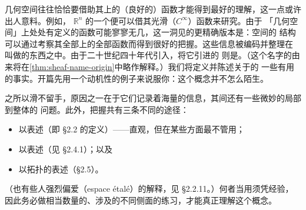 
几何空间往往恰恰要借助其上的（良好的）函数才能得到最好的理解，这一点或许出人意料。例如，
$\mathbb{R}^n$ 的一个\trDifferentiable{}\trManifold{}便可以借其光滑（$C^\infty$）函数来研究。由于%
「几何空间」上处处有定义的函数可能寥寥无几，这一洞见的更精确版本是：空间的%
结构可以通过考察其全部\trOpenSubset{}上的全部函数而得到很好的把握。这些信息被编码并整理在
叫做\emph{\trSheaf}的东西之中。\trSheaf{}由\trLeray{}于二十世纪四十年代引入，将它引进\trAlgebraicGeometry{}的
则是\trSerre。（这个名字的由来将在\cref{thm:sheaf-name-origin}中略作解释。）我们将定义\trSheaf{}并陈述关于\trSheaf{}的
一些有用的事实。开篇先用一个动机性的例子来说服你：这个概念并不怎么陌生。

\trSheaf{}之所以滑不留手，原因之一在于它们记录着海量的信息，其间还有一些微妙的局部到整体的
问题。此外，把握\trSheaf{}共有三条不同的途径：
\begin{itemize}
\item 以\trOpenSet{}表述（即 \S2.2 的定义）——直观，但在某些方面最不管用；
\item 以\trStalk{}表述（见 \S2.4.1）；以及
\item 以拓扑的\trBase{}表述（\S2.5）。
\end{itemize}
（也有些人强烈偏爱\trEspaceEtale{}（espace étalé）的解释，见 \S2.2.11。）何者当用须凭经验，
因此务必做相当数量的、涉及\trSheaf{}的不同侧面的练习，才能真正理解这个概念。
